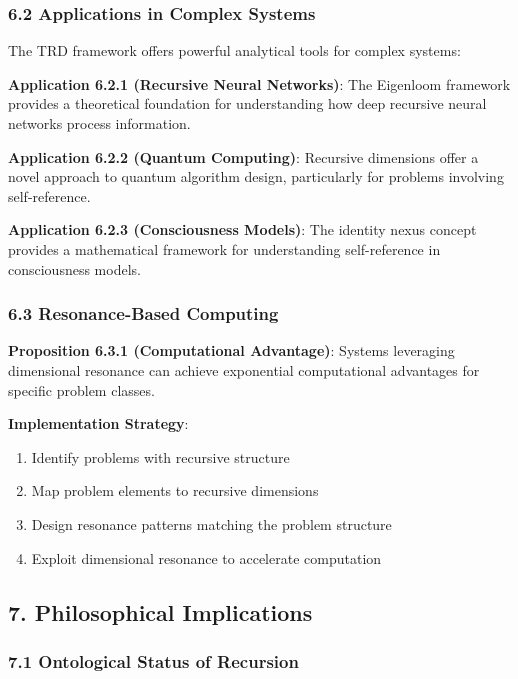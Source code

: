 \documentclass[
]{article}
\providecommand{\tightlist}{%
  \setlength{\itemsep}{0pt}\setlength{\parskip}{0pt}}
\begin{document}
\subsubsection{6.2 Applications in Complex
Systems}\label{applications-in-complex-systems}

The TRD framework offers powerful analytical tools for complex systems:

\textbf{Application 6.2.1 (Recursive Neural Networks)}: The Eigenloom
framework provides a theoretical foundation for understanding how deep
recursive neural networks process information.

\textbf{Application 6.2.2 (Quantum Computing)}: Recursive dimensions
offer a novel approach to quantum algorithm design, particularly for
problems involving self-reference.

\textbf{Application 6.2.3 (Consciousness Models)}: The identity nexus
concept provides a mathematical framework for understanding
self-reference in consciousness models.

\subsubsection{6.3 Resonance-Based
Computing}\label{resonance-based-computing}

\textbf{Proposition 6.3.1 (Computational Advantage)}: Systems leveraging
dimensional resonance can achieve exponential computational advantages
for specific problem classes.

\textbf{Implementation Strategy}:

\begin{enumerate}
\def\labelenumi{\arabic{enumi}.}
\tightlist
\item
  Identify problems with recursive structure
\item
  Map problem elements to recursive dimensions
\item
  Design resonance patterns matching the problem structure
\item
  Exploit dimensional resonance to accelerate computation
\end{enumerate}

\subsection{7. Philosophical
Implications}\label{philosophical-implications-1}

\subsubsection{7.1 Ontological Status of
Recursion}\label{ontological-status-of-recursion}
\end{document}
